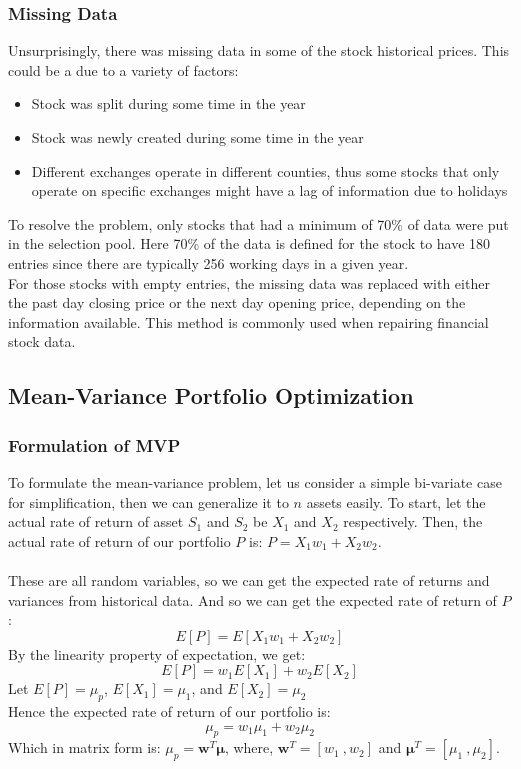 \documentclass[12pt,titlepage,letter]{article}
\begin{document}
		\subsubsection{Missing Data}
			Unsurprisingly, there was missing data in some of the stock historical prices. This could be a due to a variety of factors: 
			\begin{itemize}
				\item Stock was split during some time in the year
				\item Stock was newly created during some time in the year
				\item Different exchanges operate in different counties, thus some stocks that only operate on specific exchanges might have a lag of information due to holidays
			\end{itemize}

			To resolve the problem, only stocks that had a minimum of 70\% of data were put in the selection pool. Here 70\% of the data is defined for the stock to have 180 entries since there are typically 256 working days in a given year.\\

			For those stocks with empty entries, the missing data was replaced with either the past day closing price or the next day opening price, depending on the information available. This method is commonly used when repairing financial stock data.  

	\subsection{Mean-Variance Portfolio Optimization}
		\subsubsection{Formulation of MVP}
			To formulate the mean-variance problem, let us consider a simple bi-variate case for simplification, then we can generalize it to $n$ assets easily. To start, let the actual rate of return of asset $S_1$ and $S_2$ be $X_1$ and $X_2$ respectively. Then, the actual rate of return of our portfolio $P$ is: $P = X_1w_1 + X_2w_2$.\\
			\\
			These are all random variables, so we can get the expected rate of returns and variances from historical data. And so we can get the expected rate of return of $P$: 
			$$
				E[P] = E[X_1w_1 + X_2w_2]
			$$
			By the linearity property of expectation, we get: 
			$$
				E[P] = w_1E[X_1] + w_2E[X_2]
			$$
			Let $E[P] = \mu_p$, $E[X_1] = \mu_1$, and $E[X_2]=\mu_2$ \\
			Hence the expected rate of return of our portfolio is: 
			$$
				\mu_p = w_1 \mu_1 + w_2 \mu_2
			$$
			Which in matrix form is: $\mu_p = \mathbf{w}^T\pmb{\mu}$, where,  $\mathbf{w}^T = [ w_1\ ,  w_2 ]$ and  $\pmb{\mu}^T = [ \mu_1\ , \mu_2 ]$. \\
\end{document}
